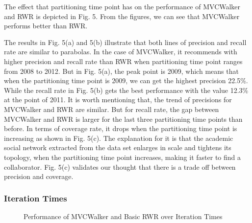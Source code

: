 \documentclass[10pt,journal,compsoc]{IEEEtran}
\begin{document}
The effect that partitioning time point has on the performance of MVCWalker and RWR is depicted in Fig. 5. From the figures, we can see that MVCWalker performs better than RWR.

The results in Fig. 5(a) and 5(b) illustrate that both lines of precision and recall rate are similar to parabolas. In the case of MVCWalker, it recommends with higher precision and recall rate than RWR when partitioning time point ranges from 2008 to 2012. But in Fig. 5(a), the peak point is 2009, which means that when the partitioning time point is 2009, we can get the highest precision 22.5\%. While the recall rate in Fig. 5(b) gets the best performance with the value 12.3\% at the point of 2011. It is worth mentioning that, the trend of precisions for MVCWalker and RWR are similar. But for recall rate, the gap between MVCWalker and RWR is larger for the last three partitioning time points than before. In terms of coverage rate, it drops when the partitioning time point is increasing as shown in Fig. 5(c). The explanation for it is that the academic social network extracted from the data set enlarges in scale and tightens its topology, when the partitioning time point increases, making it faster to find a collaborator. Fig. 5(c) validates our thought that there is a trade off between precision and coverage.

\subsubsection{Iteration Times}

\begin{figure}
\centering
{}
\caption{Performance of MVCWalker and Basic RWR over Iteration Times}
\label{fig:6}       %
\end{figure}
\end{document}
